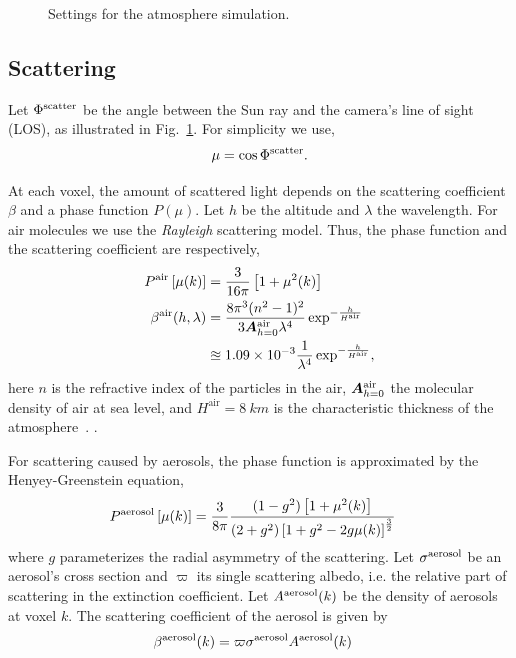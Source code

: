 \documentclass[10pt,twocolumn,letterpaper]{article}
\newcommand{\mat}[1]{\bm{#1}}
\begin{document}
\begin{figure}
  \centering {}
  
  \caption[Settings of the atmosphere simulation]{Settings for the
    atmosphere simulation.}
  \label{fig:settings}
\end{figure}

\subsection{Scattering}
\label{sec:scattering}

Let $\Phi^{\rm scatter}$ be the angle between the Sun ray and the
camera's line of sight (LOS), as illustrated in
Fig.~\ref{fig:settings}. For simplicity we use,
\begin{align}
  \mu=\cos \Phi^{\rm scatter}.
\end{align}

At each voxel, the amount of scattered light depends on the scattering
coefficient $\beta$ and a phase function $P(\mu)$. Let $h$ be the
altitude and $\lambda$ the wavelength. For air molecules we use the
\textit{Rayleigh} scattering model. Thus, the phase function and the
scattering coefficient are respectively,
\begin{align}
  P^{\rm air}\left[\mu(k)\right] &= \frac{3}{16\pi}\left[1+\mu^2(k)\right] \nonumber \\
  \beta^{\rm air}(h, \lambda) &=
  \frac{8\pi^3(n^2-1)^2}{3\mat{A}^{\rm air}_{h=0}\lambda^4}\exp^{-\frac{h}{H^\mathrm{air}}} \nonumber \\
  &\approxeq 1.09 \times 10^{-3}
  \frac{1}{\lambda^4}\exp^{-\frac{h}{H^\mathrm{air}}},
  \label{eq:rayleigh}
\end{align}
here $n$ is the refractive index of the particles in the air, $\mat{A}^{\rm air}_{h=0}$ the molecular density of air at sea level, and
$H^\mathrm{air}=8\ km$ is the characteristic thickness of the
atmosphere~\cite{Levi1980}.  .

For scattering caused by aerosols, the phase function is approximated
by the Henyey-Greenstein equation,
\begin{align}
  P^{\rm aerosol}\left[\mu(k)\right] &= \frac{3}{8\pi}\frac{(1 -
    g^2)\left[1+\mu^2(k)\right]}{(2+g^2)\left[1 + g^2 -
      2g\mu(k)\right]^\frac{3}{2}}
  \label{eq:aerosol_scatter}
\end{align}
where $g$ parameterizes the radial asymmetry of the scattering.  Let
$\sigma^{\rm aerosol}$ be an aerosol's cross section and $\varpi$ its
single scattering albedo, i.e. the relative part of scattering in the
extinction coefficient. Let $A^{\rm aerosol}(k)$ be the density of
aerosols at voxel $k$. The scattering coefficient of the aerosol is
given by
\begin{align}
  \beta^{\rm aerosol}(k) &= \varpi \sigma^{\rm aerosol} A^{\rm
    aerosol}(k)
  \label{eq:aerosol_extinct}
\end{align}
\end{document}

